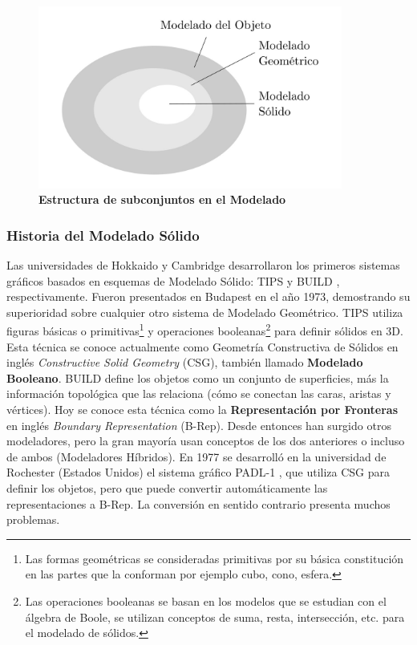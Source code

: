 \begin{figure}[h]
\includegraphics[width=10cm]{Img/GEO/geo-modelado0.jpg}
\centering
\caption{\textbf{\footnotesize{Estructura de subconjuntos en el Modelado}}}
\end{figure}


\subsubsection{Historia del Modelado Sólido }
Las universidades de Hokkaido y Cambridge desarrollaron los primeros sistemas gráficos basados en esquemas de Modelado Sólido: TIPS y BUILD \citep{Toriya:1993:CPA:562297}, respectivamente. Fueron presentados en Budapest en el año 1973, demostrando su superioridad sobre cualquier otro sistema de Modelado Geométrico.
TIPS utiliza figuras básicas o primitivas\footnote{ Las formas geométricas se consideradas primitivas por su básica constitución en las partes que la conforman por ejemplo cubo, cono, esfera.} y operaciones booleanas\footnote{Las operaciones booleanas se basan en los modelos que se estudian con el álgebra de Boole, se utilizan conceptos de suma, resta, intersección, etc. para el modelado de sólidos.} para definir sólidos en 3D. Esta técnica se conoce actualmente como Geometría Constructiva de Sólidos en inglés \textit{Constructive Solid Geometry} (CSG), también llamado \textbf{Modelado Booleano}.
BUILD define los objetos como un conjunto de superficies, más la información topológica que las relaciona (cómo se conectan las caras, aristas y vértices). Hoy se conoce esta técnica como la \textbf{Representación por Fronteras} en inglés \textit{Boundary Representation} (B-Rep).
Desde entonces han surgido otros modeladores, pero la gran mayoría usan conceptos de los dos anteriores o incluso de ambos (Modeladores Híbridos).
En 1977 se desarrolló en la universidad de Rochester (Estados Unidos) el sistema gráfico PADL-1 \citep{Toriya:1993:CPA:562297}, que utiliza CSG para definir los objetos, pero que puede convertir automáticamente las representaciones a B-Rep. La conversión en sentido contrario presenta muchos problemas. 

